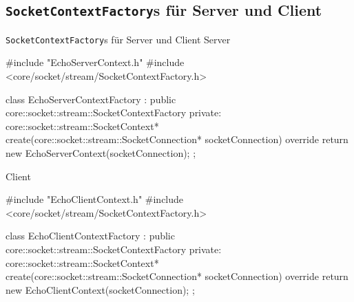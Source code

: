 \subsection{\texttt{SocketContextFactory}s für Server und Client}

\begin{frame}[fragile]{\texttt{SocketContextFactory}s für Server und Client}
  Server
  \begin{cppcode}[autogobble=true]
    #include "EchoServerContext.h"
    #include <core/socket/stream/SocketContextFactory.h>

    class EchoServerContextFactory : public core::socket::stream::SocketContextFactory {
      private:
      core::socket::stream::SocketContext* create(core::socket::stream::SocketConnection* socketConnection) override {
        return new EchoServerContext(socketConnection);
      }
    };
  \end{cppcode}
  Client
  \begin{cppcode}[autogobble=true]
    #include "EchoClientContext.h"
    #include <core/socket/stream/SocketContextFactory.h>

    class EchoClientContextFactory : public core::socket::stream::SocketContextFactory {
      private:
      core::socket::stream::SocketContext* create(core::socket::stream::SocketConnection* socketConnection) override {
        return new EchoClientContext(socketConnection);
      }
    };
  \end{cppcode}
\end{frame}
